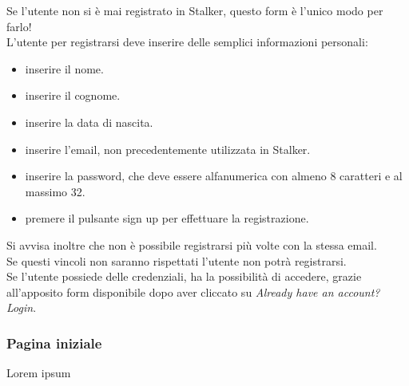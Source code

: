 \documentclass[../manuale-utente.tex]{subfiles}
\begin{document}
Se l'utente non si è mai registrato in Stalker, questo form è l'unico modo per farlo!\\
L'utente per registrarsi deve inserire delle semplici informazioni personali:

\begin{itemize}
    \item inserire il nome.
    \item inserire il cognome.
    \item inserire la data di nascita.
    \item inserire l'email, non precedentemente utilizzata in Stalker.
    \item inserire la password, che deve essere alfanumerica con almeno 8 caratteri e al massimo 32.
    \item premere il pulsante sign up per effettuare la registrazione.
\end{itemize}

Si avvisa inoltre che non è possibile registrarsi più volte con la stessa email.\\
Se questi vincoli non saranno rispettati l'utente non potrà registrarsi.\\
Se l'utente possiede delle credenziali, ha la possibilità di accedere, grazie all'apposito form disponibile dopo aver cliccato su \emph{Already have an account? Login}.
\newpage
\subsubsection{Pagina iniziale}%
\label{sub:pagina-iniziale}


Lorem ipsum

\end{document}
